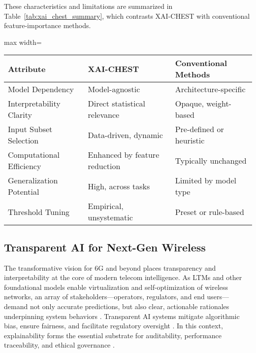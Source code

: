\documentclass[sigconf]{acmart}
\begin{document}
These characteristics and limitations are summarized in Table~\ref{tab:xai_chest_summary}, which contrasts XAI-CHEST with conventional feature-importance methods.

\begin{table*}[htbp]
\centering
\caption{Comparison of XAI-CHEST and Conventional Feature-Importance Methods}
\label{tab:xai_chest_summary}
\begin{adjustbox}{max width=\textwidth}
\begin{tabular}{lll}
\toprule
\textbf{Attribute} & \textbf{XAI-CHEST} & \textbf{Conventional Methods} \\
\midrule
Model Dependency & Model-agnostic & Architecture-specific \\
Interpretability Clarity & Direct statistical relevance & Opaque, weight-based \\
Input Subset Selection & Data-driven, dynamic & Pre-defined or heuristic \\
Computational Efficiency & Enhanced by feature reduction & Typically unchanged \\
Generalization Potential & High, across tasks & Limited by model type \\
Threshold Tuning & Empirical, unsystematic & Preset or rule-based \\
\bottomrule
\end{tabular}
\end{adjustbox}
\end{table*}

\subsection{Transparent AI for Next-Gen Wireless}

The transformative vision for 6G and beyond places transparency and interpretability at the core of modern telecom intelligence. As LTMs and other foundational models enable virtualization and self-optimization of wireless networks, an array of stakeholders—operators, regulators, and end users—demand not only accurate predictions, but also clear, actionable rationales underpinning system behaviors \cite{ref41}. Transparent AI systems mitigate algorithmic bias, ensure fairness, and facilitate regulatory oversight \cite{ref7}. In this context, explainability forms the essential substrate for auditability, performance traceability, and ethical governance \cite{ref7}\cite{ref8}\cite{ref9}\cite{ref26}\cite{ref33}\cite{ref35}\cite{ref38}\cite{ref41}.
\end{document}
